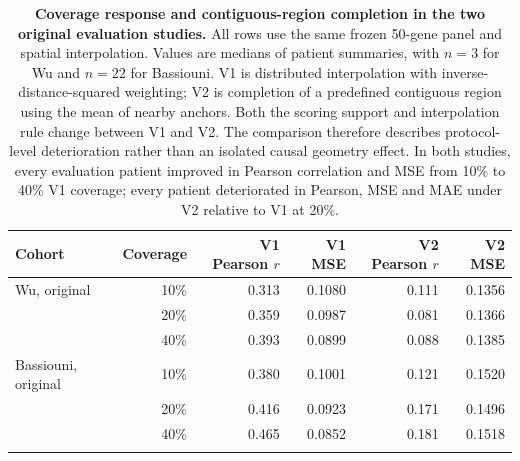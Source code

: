 \begin{table}[!htbp]
\caption{\textbf{Coverage response and contiguous-region completion in the two original evaluation studies.} All rows use the same frozen 50-gene panel and spatial interpolation. Values are medians of patient summaries, with $n=3$ for Wu and $n=22$ for Bassiouni. V1 is distributed interpolation with inverse-distance-squared weighting; V2 is completion of a predefined contiguous region using the mean of nearby anchors. Both the scoring support and interpolation rule change between V1 and V2. The comparison therefore describes protocol-level deterioration rather than an isolated causal geometry effect. In both studies, every evaluation patient improved in Pearson correlation and MSE from 10\% to 40\% V1 coverage; every patient deteriorated in Pearson, MSE and MAE under V2 relative to V1 at 20\%.}
\label{tab:coverage}
\centering\small
\begin{tabularx}{\textwidth}{@{}Yrrrrr@{}}
\toprule
Cohort & Coverage & V1 Pearson $r$ & V1 MSE & V2 Pearson $r$ & V2 MSE \\
\midrule
Wu, original & 10\% & 0.313 & 0.1080 & 0.111 & 0.1356 \\
 & 20\% & 0.359 & 0.0987 & 0.081 & 0.1366 \\
 & 40\% & 0.393 & 0.0899 & 0.088 & 0.1385 \\
\addlinespace[5pt]
Bassiouni, original & 10\% & 0.380 & 0.1001 & 0.121 & 0.1520 \\
 & 20\% & 0.416 & 0.0923 & 0.171 & 0.1496 \\
 & 40\% & 0.465 & 0.0852 & 0.181 & 0.1518 \\
\addlinespace[5pt]
\bottomrule
\end{tabularx}
\end{table}
